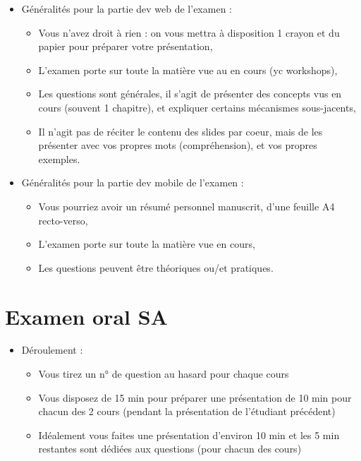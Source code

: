 \begin{itemize}
\tightlist
\item
  Généralités pour la partie dev web de l'examen :

  \begin{itemize}
  \tightlist
  \item
    Vous n'avez droit à rien : on vous mettra à disposition 1 crayon et
    du papier pour préparer votre présentation,
  \item
    L'examen porte sur toute la matière vue au en cours (yc workshops),
  \item
    Les questions sont générales, il s'agit de présenter des concepts
    vus en cours (souvent 1 chapitre), et expliquer certains mécanismes
    sous-jacents,
  \item
    Il n'agit pas de réciter le contenu des slides par coeur, mais de
    les présenter avec vos propres mots (compréhension), et vos propres
    exemples.
  \end{itemize}
\item
  Généralités pour la partie dev mobile de l'examen :

  \begin{itemize}
  \tightlist
  \item
    Vous pourriez avoir un résumé personnel manuscrit, d'une feuille A4
    recto-verso,
  \item
    L'examen porte sur toute la matière vue en cours,
  \item
    Les questions peuvent être théoriques ou/et pratiques.
  \end{itemize}
\end{itemize}

\hypertarget{examen-oral-sa-1}{%
\section{Examen oral SA}\label{examen-oral-sa-1}}

\begin{itemize}
\tightlist
\item
  Déroulement :

  \begin{itemize}
  \tightlist
  \item
    Vous tirez un n° de question au hasard pour chaque cours
  \item
    Vous disposez de 15 min pour préparer une présentation de 10 min
    pour chacun des 2 cours (pendant la présentation de l'étudiant
    précédent)
  \item
    Idéalement vous faites une présentation d'environ 10 min et les 5
    min restantes sont dédiées aux questions (pour chacun des cours)
  \end{itemize}
\end{itemize}

